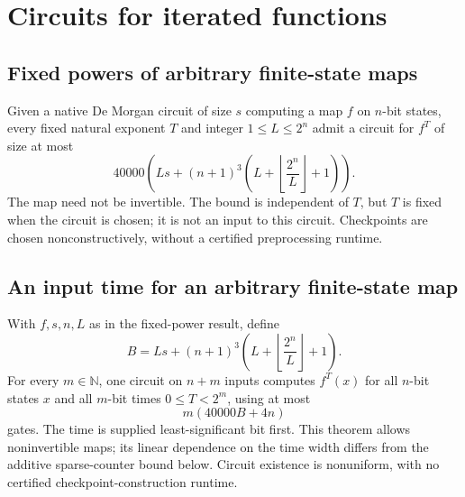 \section{Circuits for iterated functions}

\begin{result}
\subsection{Fixed powers of arbitrary finite-state maps}
Given a native De Morgan circuit of size $s$ computing a map $f$ on $n$-bit
states, every fixed natural exponent $T$ and integer $1\le L\le2^n$ admit a
circuit for $f^T$ of size at most
\[
40000\left(Ls+(n+1)^3\left(L+\left\lfloor\frac{2^n}{L}\right\rfloor+1\right)\right).
\]
The map need not be invertible. The bound is independent of $T$, but $T$ is fixed
when the circuit is chosen; it is not an input to this circuit. Checkpoints are
chosen nonconstructively, without a certified preprocessing runtime.
\citep{Schlesinger2026IteratedFunctions}
\end{result}

\begin{result}
\subsection{An input time for an arbitrary finite-state map}
With $f,s,n,L$ as in the fixed-power result, define
\[
B=L s+(n+1)^3\left(L+\left\lfloor\frac{2^n}{L}\right\rfloor+1\right).
\]
For every $m\in\mathbb N$, one circuit on $n+m$ inputs computes $f^T(x)$ for
all $n$-bit states $x$ and all $m$-bit times $0\le T<2^m$, using at most
\[
m(40000B+4n)
\]
gates. The time is supplied least-significant bit first. This theorem allows
noninvertible maps; its linear dependence on the time width differs from the
additive sparse-counter bound below. Circuit existence is nonuniform, with no
certified checkpoint-construction runtime.\citep{Schlesinger2026IteratedFunctions}
\end{result}


